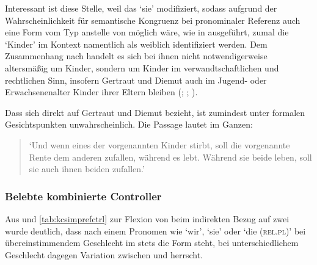 Interessant ist diese Stelle, weil  das 
 `sie' modifiziert, sodass aufgrund der
Wahrscheinlichkeit für semantische Kongruenz bei
pronominaler Referenz auch eine Form vom Typ  anstelle von
 möglich wäre, wie in  ausgeführt, zumal die
 `Kinder' im Kontext namentlich als weiblich identifiziert werden.
Dem Zusammenhang nach handelt es sich bei ihnen nicht notwendigerweise
altersmäßig um Kinder, sondern um Kinder im verwandt\-schaft\-lichen und
rechtlichen Sinn, insofern Gertraut und Diemut auch im Jugend- oder
Erwachsenen\-alter Kinder ihrer Eltern bleiben
(\cites(Nr.~2960)[240,31+35]{cao4};
\cites(Nr.~2719)[vgl.~auch][96,40--97,18]{cao4}; \cite[569, 619]{caor}).

Dass sich  direkt auf Gertraut und Diemut bezieht, ist
zumindest unter formalen Gesichtspunkten unwahrscheinlich. Die Passage lautet
im Ganzen:

\begin{quote}
	 \autocites(Nr.~2960)[240,37--39]{cao4}

`Und wenn eines der vorgenannten Kinder
stirbt, soll die vorgenannte Rente dem anderen zufallen, während es lebt.
Während sie beide leben, soll sie auch ihnen beiden zufallen.'
\end{quote}


\subsubsection{Belebte kombinierte Controller}

Aus  und \ref{tab:kcsimprefctrl} zur Flexion von
 beim indirekten Bezug auf zwei  wurde
deutlich, dass nach einem Pronomen wie  `wir',  `sie' oder
 `die (\textsc{rel.pl})' bei übereinstimmendem Geschlecht im \CAO{}
stets die Form  steht, bei unterschiedlichem Geschlecht dagegen
Variation zwischen   und 
 herrscht.

